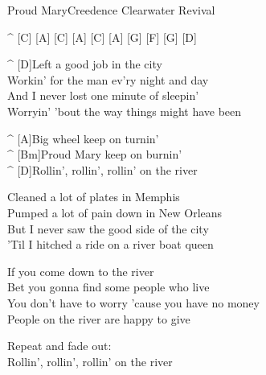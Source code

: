 \begin{song}{Proud Mary}{Creedence Clearwater Revival}

\begin{guitar}
^ [C] [A] [C] [A] [C] [A] [G] [F] [G] [D]\\

\end{guitar}
\begin{guitar}
^ [D]Left a good job in the city\\
Workin' for the man ev'ry night and day \\
And I never lost one minute of sleepin'\\
Worryin' 'bout the way things might have been\\
\end{guitar}

\begin{guitar}
^ [A]Big wheel keep on turnin'\\
^ [Bm]Proud Mary keep on burnin' \\
^ [D]Rollin', rollin', rollin' on the river \\
\end{guitar}

\begin{guitar}
Cleaned a lot of plates in Memphis \\
Pumped a lot of pain down in New Orleans \\
But I never saw the good side of the city \\
'Til I hitched a ride on a river boat queen \\
\end{guitar}



\begin{guitar}
If you come down to the river\\
Bet you gonna find some people who live \\
You don't have to worry 'cause you have no money \\
People on the river are happy to give\\
\end{guitar}


\begin{guitar}
Repeat and fade out:\\
Rollin', rollin', rollin' on the river\\
\end{guitar}
\end{song}
